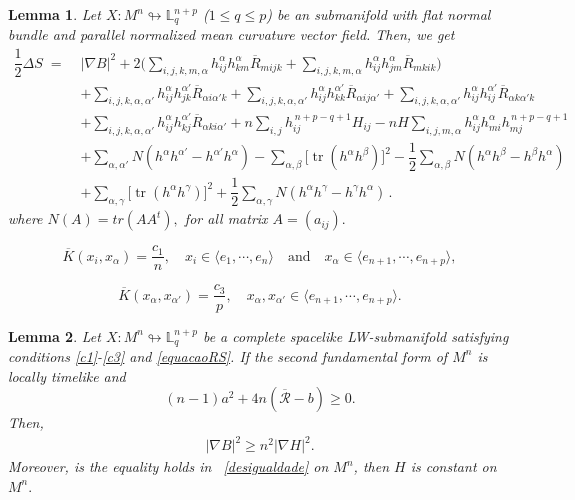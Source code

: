 \documentclass[10pt,a4paper]{amsart}
\newtheorem{lemma}{Lemma}
\begin{document}
\begin{lemma}\label{formula simons}
Let $X:M^{n}\looparrowright \mathbb{L}^{n+p}_{q}$ ($1\leq q\leq p$) be an submanifold with flat normal bundle and parallel normalized mean curvature vector field. Then, we get
\begin{equation}\label{simons_identity}
\begin{aligned}
\dfrac{1}{2}\Delta S \;=\;& |\nabla B|^2
  + 2\Bigg(
      \sum_{i,j,k,m,\alpha} h_{ij}^{\alpha}h_{km}^{\alpha}\overline{R}_{mijk}
      + \sum_{i,j,k,m,\alpha} h_{ij}^{\alpha}h_{jm}^{\alpha}\overline{R}_{mkik}
    \Bigg) \\[6pt]
&+ \sum_{i,j,k,\alpha,\alpha'} h_{ij}^{\alpha}h_{jk}^{\alpha'}\overline{R}_{\alpha i \alpha' k}
  + \sum_{i,j,k,\alpha,\alpha'} h_{ij}^{\alpha}h_{kk}^{\alpha'}\overline{R}_{\alpha ij \alpha'}
  + \sum_{i,j,k,\alpha,\alpha'} h_{ij}^{\alpha}h_{ij}^{\alpha'}\overline{R}_{\alpha k \alpha' k} \\[6pt]
&+ \sum_{i,j,k,\alpha,\alpha'} h_{ij}^{\alpha}h_{kj}^{\alpha'}\overline{R}_{\alpha ki \alpha'}
  + n\sum_{i,j} h_{ij}^{\,n+p-q+1}H_{ij}
  - nH\sum_{i,j,m,\alpha} h_{ij}^{\alpha}h_{mi}^{\alpha}h_{mj}^{\,n+p-q+1} \\[6pt]
&+ \sum_{\alpha,\alpha'} N(h^{\alpha}h^{\alpha'}-h^{\alpha'}h^{\alpha})
  - \sum_{\alpha,\beta} \big[\operatorname{tr}(h^{\alpha}h^{\beta})\big]^2
  - \dfrac{1}{2}\sum_{\alpha,\beta} N(h^{\alpha}h^{\beta}-h^{\beta}h^{\alpha}) \\[6pt]
&+ \sum_{\alpha,\gamma} \big[\operatorname{tr}(h^{\alpha}h^{\gamma})\big]^2
  + \dfrac{1}{2}\sum_{\alpha,\gamma} N(h^{\alpha}h^{\gamma}-h^{\gamma}h^{\alpha}) \,.
\end{aligned}
\end{equation}
where $N(A)=tr(AA^{t}),$ for all matrix $A=(a_{ij}).$
\end{lemma}

\begin{equation}\label{c1}
\overline{K}(x_i,x_{\alpha})=\dfrac{c_1}{n},\quad x_i\in \langle e_1,\cdots, e_n\rangle\quad\mbox{and}\quad x_{\alpha}\in \langle e_{n+1},\cdots,e_{n+p}\rangle,
\end{equation}

\begin{equation}\label{c3}
\overline{K}(x_{\alpha},x_{\alpha'})=\dfrac{c_3}{p},\quad x_{\alpha},x_{\alpha'}\in \langle e_{n+1},\cdots,e_{n+p}\rangle.
\end{equation}

\begin{lemma}\label{desigualdade_BeH}
Let $X:M^n\looparrowright \mathbb{L}^{n+p}_{q}$ be a complete spacelike LW-submanifold satisfying conditions \eqref{c1}-\eqref{c3} and \eqref{equacaoRS}. If the second fundamental form of $M^n$ is locally timelike and
\begin{equation}\label{H1}
(n-1)a^2+4n(\overline{\mathcal{R}}-b)\geq 0.
\end{equation}
Then, 
\begin{eqnarray}\label{desigualdade}
|\nabla B|^2 \geq n^2|\nabla H|^2.
\end{eqnarray}
Moreover, is the equality holds in ~\eqref{desigualdade} on $M^{n}$, then $H$ is constant on $M^{n}.$
\end{lemma}
\end{document}
